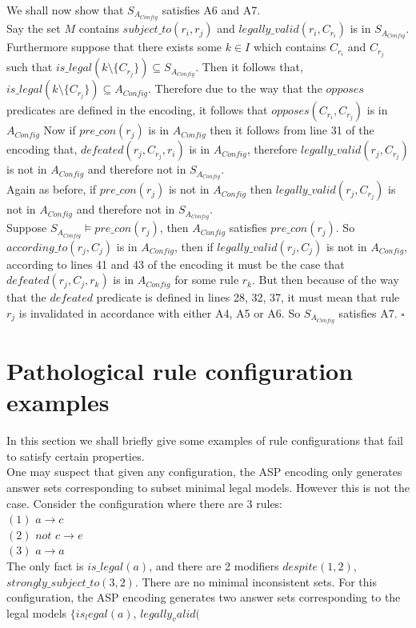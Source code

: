 We shall now show that $S_{A_{Config}}$ satisfies A6 and A7.\\

Say the set $M$ contains $subject\_to(r_{i}, r_{j})$ and $legally\_valid(r_{i}, C_{r_{i}})$ is in $S_{A_{Config}}$. Furthermore suppose that there exists some $k\in I$ which contains $C_{r_{i}}$ and $C_{r_{j}}$ such that $is\_legal(k\setminus \{C_{r_{j}}\})\subseteq S_{A_{Config}}$. Then it follows that, $is\_legal(k\setminus \{C_{r_{j}}\})\subseteq A_{Config}$. Therefore due to the way that the $opposes$ predicates are defined in the encoding, it follows that $opposes(C_{r_{i}}, C_{r_{j}})$ is in $A_{Config}$ Now if $pre\_con(r_{j})$ is in $A_{Config}$ then it follows from line 31 of the encoding that, $defeated(r_{j}, C_{r_{j}}, r_{i}) $ is in $A_{Config}$, therefore $legally\_valid(r_{j}, C_{r_{j}})$ is not in $A_{Config}$ and therefore not in $S_{A_{Config}}$.\\

Again as before, if $pre\_con(r_{j})$ is not in $A_{Config}$ then $legally\_valid(r_{j}, C_{r_{j}})$ is not in $A_{Config}$ and therefore not in $S_{A_{Config}}$.\\

Suppose $S_{A_{Config}}\models pre\_con(r_{j})$, then $A_{Config}$ satisfies $pre\_con(r_{j})$. So $according\_to(r_{j},C_{j})$ is in $A_{Config}$, then if $legally\_valid(r_{j}, C_{j})$ is not in $A_{Config}$, according to lines 41 and 43 of the encoding it must be the case that $defeated(r_{j},C_{j},r_{k})$ is in $A_{Config}$ for some rule $r_{k}$. But then because of the way that the $defeated$ predicate is defined in lines 28, 32, 37, it must mean that rule $r_{j}$ is invalidated in accordance with either A4, A5 or A6. So $S_{A_{Config}}$ satisfies A7. $\square$
\section{Pathological rule configuration examples}
In this section we shall briefly give some examples of rule configurations that fail to satisfy certain properties.\\

One may suspect that given any configuration, the ASP encoding only generates answer sets corresponding to subset minimal legal models. However this is not the case. Consider the configuration where there are 3 rules:\\ $(1)$ $a\rightarrow c$\\
$(2)$ $not$ $c\rightarrow e$\\
$(3)$ $a\rightarrow a$\\
The only fact is $is\_legal(a)$, and there are 2 modifiers $despite(1,2)$, $strongly\_subject\_to(3,2)$. There are no minimal inconsistent sets. For this configuration, the ASP encoding generates two answer sets corresponding to the legal models $\{is_legal(a)$, $legally_valid($




